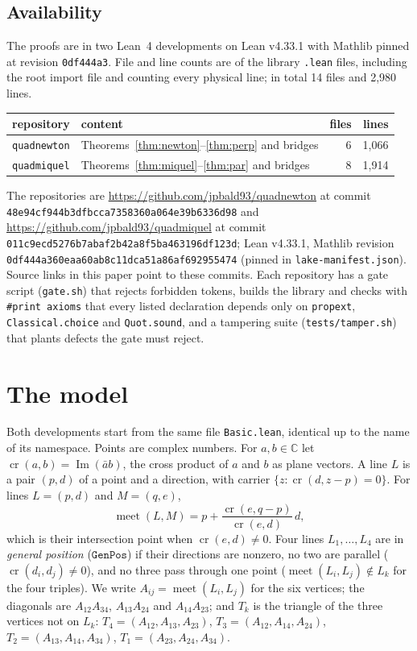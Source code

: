 \documentclass[11pt]{article}
\theoremstyle{definition}
\theoremstyle{remark}
\newcommand{\lean}[1]{\texttt{#1}}
\newcommand{\CC}{\mathbb{C}}
\begin{document}
\subsection{Availability}\label{sec:avail}
The proofs are in two Lean~4 developments on Lean v4.33.1 with Mathlib pinned at revision
\texttt{0df444a3}. File and line counts are of the library \lean{.lean} files, including the root
import file and counting every physical line; in total 14 files and 2{,}980 lines.
\begin{center}\small
\begin{tabular}{llrr}
\toprule
repository & content & files & lines\\
\midrule
\lean{quadnewton} & Theorems~\ref{thm:newton}--\ref{thm:perp} and bridges & 6 & 1{,}066\\
\lean{quadmiquel} & Theorems~\ref{thm:miquel}--\ref{thm:par} and bridges & 8 & 1{,}914\\
\bottomrule
\end{tabular}
\end{center}
The repositories are \url{https://github.com/jpbald93/quadnewton} at commit
\texttt{48e94cf944b3dfbcca7358360a064e39b6336d98} and \url{https://github.com/jpbald93/quadmiquel} at commit
\texttt{011c9ecd5276b7abaf2b42a8f5ba463196df123d}; Lean v4.33.1, Mathlib revision \texttt{0df444a360eaa60ab8c11dca51a86af692955474}
(pinned in \lean{lake-manifest.json}). Source links in this paper point to these commits.
Each repository has a gate script (\lean{gate.sh}) that rejects forbidden tokens, builds the library
and checks with \lean{\#print axioms} that every listed declaration depends only on
\lean{propext}, \lean{Classical.choice} and \lean{Quot.sound}, and a tampering suite
(\lean{tests/tamper.sh}) that plants defects the gate must reject.

\section{The model}\label{sec:model}

Both developments start from the same file \lean{Basic.lean}, identical up to the name of its
namespace. Points are complex numbers. For $a,b\in\CC$ let $\operatorname{cr}(a,b)=\operatorname{Im}(\bar a b)$,
the cross product of $a$ and $b$ as plane vectors. A line $L$ is a pair $(p,d)$ of a point and a
direction, with carrier $\{z:\operatorname{cr}(d,z-p)=0\}$. For lines $L=(p,d)$ and $M=(q,e)$,
\[
  \operatorname{meet}(L,M)=p+\frac{\operatorname{cr}(e,q-p)}{\operatorname{cr}(e,d)}\,d ,
\]
which is their intersection point when $\operatorname{cr}(e,d)\neq0$. Four lines $L_1,\dots,L_4$ are in
\emph{general position} ($\lean{GenPos}$) if their directions are nonzero, no two are parallel
($\operatorname{cr}(d_i,d_j)\ne0$), and no three pass through one point
($\operatorname{meet}(L_i,L_j)\notin L_k$ for the four triples). We write $A_{ij}=\operatorname{meet}(L_i,L_j)$
for the six vertices; the diagonals are $A_{12}A_{34}$, $A_{13}A_{24}$ and $A_{14}A_{23}$; and
$T_k$ is the triangle of the three vertices not on $L_k$: $T_4=(A_{12},A_{13},A_{23})$,
$T_3=(A_{12},A_{14},A_{24})$, $T_2=(A_{13},A_{14},A_{34})$, $T_1=(A_{23},A_{24},A_{34})$.
\end{document}
